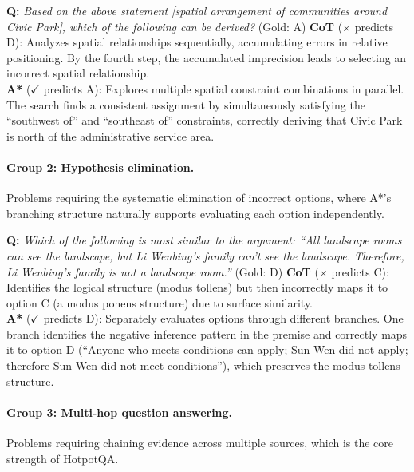 \documentclass[11pt]{article}
\begin{document}
\begin{examplebox}[title=LogicQA --- Non-linear Evidence Aggregation]
\textbf{Q:} \emph{Based on the above statement [spatial arrangement of communities around Civic Park], which of the following can be derived?} \quad (Gold: A)
\tcblower
\textbf{CoT} ($\times$ predicts D): Analyzes spatial relationships sequentially, accumulating errors in relative positioning. By the fourth step, the accumulated imprecision leads to selecting an incorrect spatial relationship.\\[4pt]
\textbf{A*} ($\checkmark$ predicts A): Explores multiple spatial constraint combinations in parallel. The search finds a consistent assignment by simultaneously satisfying the ``southwest of'' and ``southeast of'' constraints, correctly deriving that Civic Park is north of the administrative service area.
\end{examplebox}

\paragraph{Group 2: Hypothesis elimination.} Problems requiring the systematic elimination of incorrect options, where A*'s branching structure naturally supports evaluating each option independently.

\begin{examplebox}[title=LogicQA --- Hypothesis Elimination]
\textbf{Q:} \emph{Which of the following is most similar to the argument: ``All landscape rooms can see the landscape, but Li Wenbing's family can't see the landscape. Therefore, Li Wenbing's family is not a landscape room.''} \quad (Gold: D)
\tcblower
\textbf{CoT} ($\times$ predicts C): Identifies the logical structure (modus tollens) but then incorrectly maps it to option C (a modus ponens structure) due to surface similarity.\\[4pt]
\textbf{A*} ($\checkmark$ predicts D): Separately evaluates options through different branches. One branch identifies the negative inference pattern in the premise and correctly maps it to option D (``Anyone who meets conditions can apply; Sun Wen did not apply; therefore Sun Wen did not meet conditions''), which preserves the modus tollens structure.
\end{examplebox}

\paragraph{Group 3: Multi-hop question answering.} Problems requiring chaining evidence across multiple sources, which is the core strength of HotpotQA.
\end{document}
